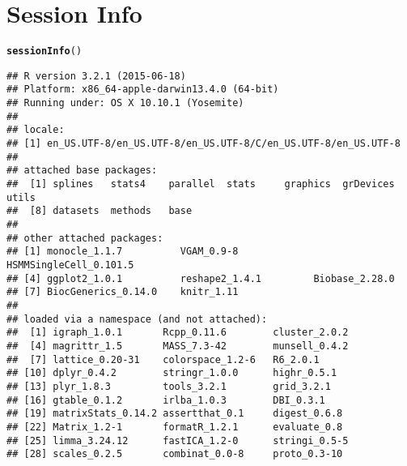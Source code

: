 \documentclass[10pt,oneside]{article}\usepackage[]{graphicx}\usepackage[]{color}
\makeatletter
\newcommand{\hlstd}[1]{\textcolor[rgb]{0.345,0.345,0.345}{#1}}%
\newcommand{\hlkwd}[1]{\textcolor[rgb]{0.737,0.353,0.396}{\textbf{#1}}}%
\newenvironment{kframe}{%
 \def\at@end@of@kframe{}%
 \ifinner\ifhmode%
  \def\at@end@of@kframe{\end{minipage}}%
  \begin{minipage}{\columnwidth}%
 \fi\fi%
 \def\FrameCommand##1{\hskip\@totalleftmargin \hskip-\fboxsep
 \colorbox{shadecolor}{##1}\hskip-\fboxsep
     \hskip-\linewidth \hskip-\@totalleftmargin \hskip\columnwidth}%
 \MakeFramed {\advance\hsize-\width
   \@totalleftmargin\z@ \linewidth\hsize
   \@setminipage}}%
 {\par\unskip\endMakeFramed%
 \at@end@of@kframe}
\newenvironment{knitrout}{}{} %
\makeatother
\begin{document}
\section{Session Info}
\begin{knitrout}
\color{fgcolor}\begin{kframe}
\begin{alltt}
\hlkwd{sessionInfo}\hlstd{()}
\end{alltt}
\begin{verbatim}
## R version 3.2.1 (2015-06-18)
## Platform: x86_64-apple-darwin13.4.0 (64-bit)
## Running under: OS X 10.10.1 (Yosemite)
## 
## locale:
## [1] en_US.UTF-8/en_US.UTF-8/en_US.UTF-8/C/en_US.UTF-8/en_US.UTF-8
## 
## attached base packages:
##  [1] splines   stats4    parallel  stats     graphics  grDevices utils    
##  [8] datasets  methods   base     
## 
## other attached packages:
## [1] monocle_1.1.7          VGAM_0.9-8             HSMMSingleCell_0.101.5
## [4] ggplot2_1.0.1          reshape2_1.4.1         Biobase_2.28.0        
## [7] BiocGenerics_0.14.0    knitr_1.11            
## 
## loaded via a namespace (and not attached):
##  [1] igraph_1.0.1       Rcpp_0.11.6        cluster_2.0.2     
##  [4] magrittr_1.5       MASS_7.3-42        munsell_0.4.2     
##  [7] lattice_0.20-31    colorspace_1.2-6   R6_2.0.1          
## [10] dplyr_0.4.2        stringr_1.0.0      highr_0.5.1       
## [13] plyr_1.8.3         tools_3.2.1        grid_3.2.1        
## [16] gtable_0.1.2       irlba_1.0.3        DBI_0.3.1         
## [19] matrixStats_0.14.2 assertthat_0.1     digest_0.6.8      
## [22] Matrix_1.2-1       formatR_1.2.1      evaluate_0.8      
## [25] limma_3.24.12      fastICA_1.2-0      stringi_0.5-5     
## [28] scales_0.2.5       combinat_0.0-8     proto_0.3-10
\end{verbatim}
\end{kframe}
\end{knitrout}



\end{document}

